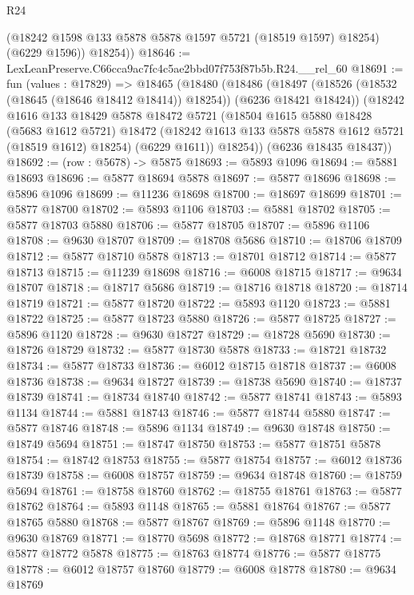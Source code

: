 \begin{lexlean}{R24}
\begin{coremodule}
          (@18242 @1598 @133 @5878 @5878 @1597 @5721 (@18519 @1597) @18254)
          (@6229 @1596))
        @18254))
@18646 := LexLeanPreserve.C66cca9ac7fc4c5ae2bbd07f753f87b5b.R24.__rel_60
@18691 := fun (values : @17829) =>
  @18465
    (@18480
      (@18486
        (@18497 (@18526 (@18532 (@18645 (@18646 @18412 @18414)) @18254)) (@6236 @18421 @18424))
        (@18242
          @1616
          @133
          @18429
          @5878
          @18472
          @5721
          (@18504
            @1615
            @5880
            @18428
            (@5683 @1612 @5721)
            @18472
            (@18242 @1613 @133 @5878 @5878 @1612 @5721 (@18519 @1612) @18254)
            (@6229 @1611))
          @18254))
      (@6236 @18435 @18437))
@18692 := (row : @5678) -> @5875
@18693 := @5893 @1096
@18694 := @5881 @18693
@18696 := @5877 @18694 @5878
@18697 := @5877 @18696
@18698 := @5896 @1096
@18699 := @11236 @18698
@18700 := @18697 @18699
@18701 := @5877 @18700
@18702 := @5893 @1106
@18703 := @5881 @18702
@18705 := @5877 @18703 @5880
@18706 := @5877 @18705
@18707 := @5896 @1106
@18708 := @9630 @18707
@18709 := @18708 @5686
@18710 := @18706 @18709
@18712 := @5877 @18710 @5878
@18713 := @18701 @18712
@18714 := @5877 @18713
@18715 := @11239 @18698
@18716 := @6008 @18715
@18717 := @9634 @18707
@18718 := @18717 @5686
@18719 := @18716 @18718
@18720 := @18714 @18719
@18721 := @5877 @18720
@18722 := @5893 @1120
@18723 := @5881 @18722
@18725 := @5877 @18723 @5880
@18726 := @5877 @18725
@18727 := @5896 @1120
@18728 := @9630 @18727
@18729 := @18728 @5690
@18730 := @18726 @18729
@18732 := @5877 @18730 @5878
@18733 := @18721 @18732
@18734 := @5877 @18733
@18736 := @6012 @18715 @18718
@18737 := @6008 @18736
@18738 := @9634 @18727
@18739 := @18738 @5690
@18740 := @18737 @18739
@18741 := @18734 @18740
@18742 := @5877 @18741
@18743 := @5893 @1134
@18744 := @5881 @18743
@18746 := @5877 @18744 @5880
@18747 := @5877 @18746
@18748 := @5896 @1134
@18749 := @9630 @18748
@18750 := @18749 @5694
@18751 := @18747 @18750
@18753 := @5877 @18751 @5878
@18754 := @18742 @18753
@18755 := @5877 @18754
@18757 := @6012 @18736 @18739
@18758 := @6008 @18757
@18759 := @9634 @18748
@18760 := @18759 @5694
@18761 := @18758 @18760
@18762 := @18755 @18761
@18763 := @5877 @18762
@18764 := @5893 @1148
@18765 := @5881 @18764
@18767 := @5877 @18765 @5880
@18768 := @5877 @18767
@18769 := @5896 @1148
@18770 := @9630 @18769
@18771 := @18770 @5698
@18772 := @18768 @18771
@18774 := @5877 @18772 @5878
@18775 := @18763 @18774
@18776 := @5877 @18775
@18778 := @6012 @18757 @18760
@18779 := @6008 @18778
@18780 := @9634 @18769

\end{coremodule}
\end{lexlean}
